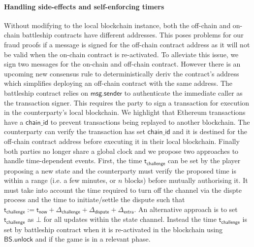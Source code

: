 \documentclass{llncs}
\newcommand{\battleshipunlock}{\mathsf{BS.unlock}}
\newcommand{\appcontract}{\mathsf{AC}}
\newcommand{\timerchallenge}{\mathsf{\Delta}_{\mathsf{challenge}}}
\newcommand{\timechallenge}{\mathsf{t}_{\mathsf{challenge}}}
\newcommand{\timerextra}{\mathsf{\Delta}_{\mathsf{extra}}}
\newcommand{\timerdispute}{\mathsf{\Delta}_{\mathsf{dispute}}}
\newcommand{\timenow}{\mathsf{t}_{\mathsf{now}}}
\begin{document}
	
	\paragraph{Handling side-effects and self-enforcing  timers} \label{sec:sideffectshandle}
	Without modifying to the local blockchain instance, both the off-chain and on-chain battleship contracts have different addresses.
	This poses problems for our fraud proofs if a message is signed for the off-chain contract address as it will not be valid when the on-chain contract is re-activated.
	To alleviate this issue, we sign two messages for the on-chain and off-chain contract.
	However there is an upcoming new consensus rule  \cite{eip1014} to deterministically deriv the contract's address which simplifies deploying an off-chain contract with the same address. 
	The battleship contract relies on $\mathsf{msg.sender}$ to authenticate the immediate caller as the transaction signer.
	This requires the party to sign a transaction for execution in the counterparty's local blockchain. 
	We highlight that Ethereum transactions have a $\mathsf{chain\_id}$ to prevent transactions being replayed to another blockchain.
	The counterparty can verify the transaction has set  $\mathsf{chain\_id}$  and it is destined for the off-chain contract address before executing it in their local blockchain. 
	Finally both parties no longer share a global clock and we propose two approaches to handle time-dependent events. 
	First, the time $\timechallenge$ can be set by the player proposing a new state and the counterparty must verify the proposed time is within a range (i.e. a few minutes, or $n$ blocks) before mutually authorising it.
	It must take into account the time required to turn off the channel via the dispte process and the time to initiate/settle the dispute such that $\timechallenge := \timenow + \timerchallenge + \timerdispute + \timerextra$. 
	An alternative approach is to set $\timechallenge$ as $\bot$ for all updates within the state channel. 
	Instead the time $\timechallenge$ is set by battleship contract when it is re-activated in the blockchain using $\battleshipunlock$ and if the game is in a relevant phase.
	
\end{document}
